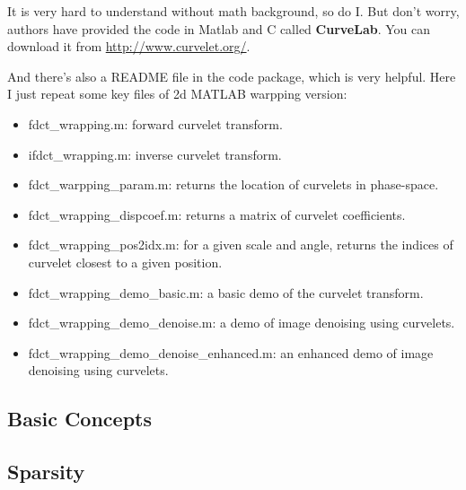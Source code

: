 \documentclass[12pt]{ctexart}
\begin{document}
It is very hard to understand without math background, so do I. But don't worry, authors
have provided the code in Matlab and C called \textbf{CurveLab}. You can download it
from \url{http://www.curvelet.org/}.

And there's also a README file in the code package, which is very helpful. Here I just
repeat some key files of 2d MATLAB warpping version:

\begin{itemize}
  \item fdct\_wrapping.m: forward curvelet transform.
  \item ifdct\_wrapping.m: inverse curvelet transform.
  \item fdct\_warpping\_param.m: returns the location of curvelets in phase-space.
  \item fdct\_wrapping\_dispcoef.m: returns a matrix of curvelet coefficients.
  \item fdct\_wrapping\_pos2idx.m: for a given scale and angle, returns the indices of
  curvelet closest to a given position.
  \item fdct\_wrapping\_demo\_basic.m: a basic demo of the curvelet transform.
  \item fdct\_wrapping\_demo\_denoise.m: a demo of image denoising using curvelets.
  \item fdct\_wrapping\_demo\_denoise\_enhanced.m: an enhanced demo of image denoising
  using curvelets.
\end{itemize}

\newpage
\thispagestyle{empty}
\begin{center}
    \vspace*{96pt}
    \fontsize{60}{60}\par
    \fontsize{26}{31.2}\section{\textbf{Basic Concepts}}\par %
    \vspace{25pt}
    \fontsize{18}{21.6}\par %
    \vfill
\end{center}

\newpage
\subsection{\textbf{Sparsity}}
\end{document}
